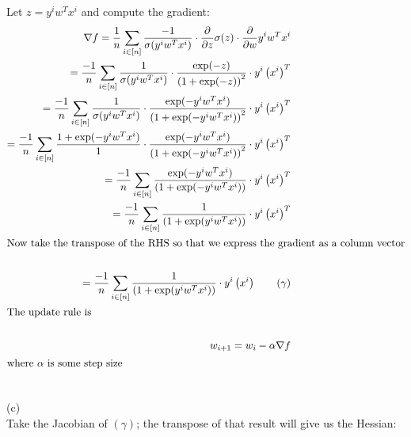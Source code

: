 \documentclass[../main.tex]{subfiles}
\begin{document}
Let $z = y^{i}w^Tx^{i}$ and compute the gradient:
\begin{align*}
    \nabla f = \frac{1}{n}\sum_{i \in [n]}^{}\frac{-1}{\sigma(y^{i}w^Tx^{i})} \cdot \frac{\partial}{\partial z}\sigma(z) \cdot \frac{\partial}{\partial w}y^{i}w^{T}x^{i} \\ 
    = \frac{-1}{n}\sum_{i \in [n]}^{}\frac{1}{\sigma(y^{i}w^Tx^{i})} \cdot \frac{\exp(-z)}{\left(1 + \exp(-z)\right)^2}  \cdot y^{i}\left(x^{i}\right)^T \\ 
    = \frac{-1}{n}\sum_{i \in [n]}^{}\frac{1}{\sigma(y^{i}w^Tx^{i})} \cdot \frac{\exp(-y^{i}w^Tx^{i})}{\left(1 + \exp(-y^{i}w^Tx^{i})\right)^2}  \cdot y^{i}\left(x^{i}\right)^T \\ 
    = \frac{-1}{n}\sum_{i \in [n]}^{}\frac{1 + \exp(-y^{i}w^Tx^{i})}{1} \cdot \frac{\exp(-y^{i}w^Tx^{i})}{\left(1 + \exp(-y^{i}w^Tx^{i})\right)^2}  \cdot y^{i}\left(x^{i}\right)^T \\ 
    = \frac{-1}{n}\sum_{i \in [n]}^{}\frac{\exp(-y^{i}w^Tx^{i})}{\left(1 + \exp(-y^{i}w^Tx^{i})\right)}  \cdot y^{i}\left(x^{i}\right)^T \\ 
    = \frac{-1}{n}\sum_{i \in [n]}^{}\frac{1}{\left(1 + \exp(y^{i}w^Tx^{i})\right)}  \cdot y^{i}\left(x^{i}\right)^T \\ 
    \intertext{Now take the transpose of the RHS so that we express the gradient as a column vector} \\
    = \frac{-1}{n}\sum_{i \in [n]}^{}\frac{1}{\left(1 + \exp(y^{i}w^Tx^{i})\right)}  \cdot y^{i}\left(x^{i}\right) \tag{$\gamma$}\\ 
    \intertext{The update rule is} \\
    w_{i+1} = w_{i} - \alpha \nabla f \\
    \intertext{where $\alpha$ is some step size} \\
\end{align*}


(c) \\

Take the Jacobian of $(\gamma)$; the transpose of that result will give us the Hessian:
\end{document}
